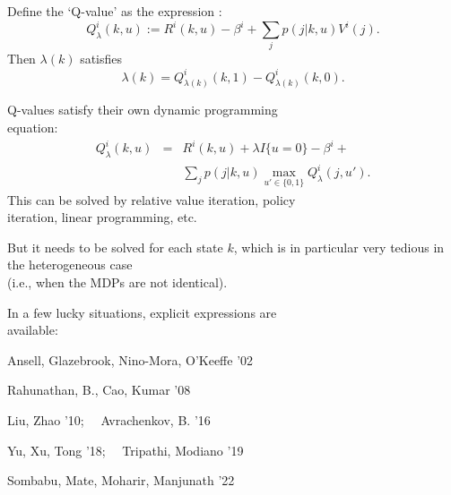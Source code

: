 \documentclass{slides}
\begin{document}
{Define the `Q-value' as the expression :
$$Q_\lambda^i(k,u) := R^i(k,u)  - \beta^i + \sum_jp(j|k,u)V^i(j).$$
Then $\lambda(k)$ satisfies
$$ \lambda(k) = Q_{\lambda(k)}^i(k,1) - Q_{\lambda(k)}^i(k,0).$$

\newpage

Q-values satisfy their own dynamic programming\\ equation:
\begin{eqnarray*}
Q_\lambda^i(k,u) &=& R^i(k,u) + \lambda I\{u=0\} - \beta^i + \\
&& \sum_jp(j|k,u)\max_{u'\in\{0,1\}}Q_\lambda^i(j,u').
\end{eqnarray*}
This can be solved by relative value iteration, policy\\ iteration, linear programming, etc.

But it needs to be solved for {\color{red} each state $k$}, which is in particular very tedious in the heterogeneous case\\ (i.e., when the MDPs are not identical).

\newpage

In a few lucky situations, explicit expressions are\\ available:

Ansell, Glazebrook, Nino-Mora, O'Keeffe '02 

Rahunathan, B., Cao, Kumar '08

Liu, Zhao '10;  \ \ 
Avrachenkov, B. '16 

Yu, Xu, Tong '18; \ \ 
Tripathi, Modiano '19  

Sombabu, Mate, Moharir, Manjunath '22
}
\end{document}

